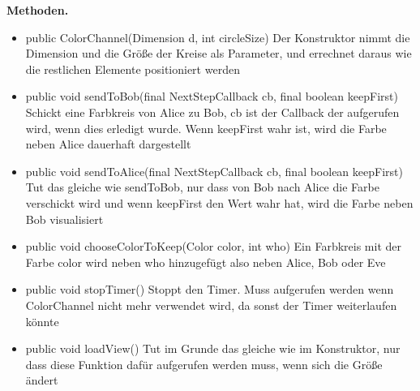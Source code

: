 \documentclass{article}
\begin{document}
    \textbf{Methoden.}\newline
	   \begin{itemize}
           \item public ColorChannel(Dimension d, int circleSize) \newline
               Der Konstruktor nimmt die Dimension und die Größe der Kreise als Parameter,\newline
               und errechnet daraus wie die restlichen Elemente positioniert werden\newline
           \item public void sendToBob(final NextStepCallback cb, final boolean keepFirst) \newline
               Schickt eine Farbkreis von Alice zu Bob, cb ist der Callback der aufgerufen wird, wenn dies\newline
               erledigt wurde.\newline
               Wenn keepFirst wahr ist, wird die Farbe neben Alice dauerhaft dargestellt\newline
           \item public void sendToAlice(final NextStepCallback cb, final boolean keepFirst) \newline
               Tut das gleiche wie sendToBob, nur dass von Bob nach Alice die Farbe verschickt wird und\newline
               wenn keepFirst den Wert wahr hat, wird die Farbe neben Bob visualisiert\newline
           \item public void chooseColorToKeep(Color color, int who) \newline
               Ein Farbkreis mit der Farbe color wird neben who hinzugefügt also neben Alice, Bob oder Eve\newline
           \item public void stopTimer() \newline
               Stoppt den Timer. Muss aufgerufen werden wenn ColorChannel nicht mehr verwendet wird,\newline
               da sonst der Timer weiterlaufen könnte\newline
           \item public void loadView() \newline
               Tut im Grunde das gleiche wie im Konstruktor, nur dass diese Funktion dafür\newline
               aufgerufen werden muss, wenn sich die Größe ändert\newline

\end{itemize}
\end{document}
